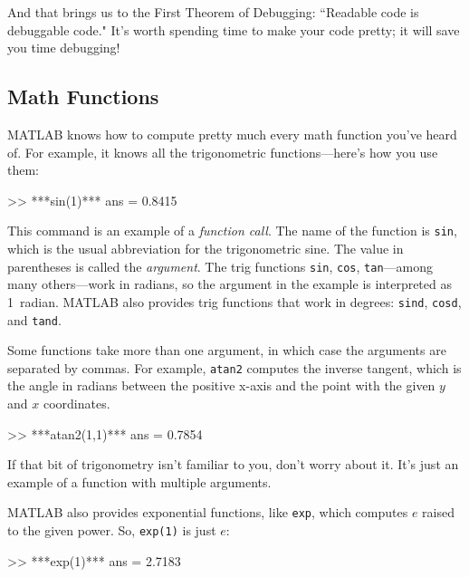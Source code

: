 
And that brings us to the First Theorem of Debugging: ``Readable code is debuggable code."
It's worth spending time to make your code pretty; it will save
you time \mbox{debugging}!


\subsection{Math Functions}

MATLAB knows how to compute pretty much every math function you've
heard of. For example, it knows all the trigonometric functions---here's how you
use them:


\begin{code}
>> ***sin(1)***
ans = 0.8415
\end{code}

This command is an example of a \emph{function call}.  The name of the
function is \lstinline{sin}, which is the usual abbreviation for the
trigonometric sine.  The value in parentheses is called the \emph{argument}.
%
%
The trig functions \lstinline{sin}, \lstinline{cos}, \lstinline{tan}---among many
others---work in radians, so the argument in the example is interpreted as 1~radian.
MATLAB also provides trig functions that work in degrees: \lstinline{sind}, \lstinline{cosd}, and \lstinline{tand}.

Some functions take more than one argument, in which case the arguments are
separated by commas.  For example, \lstinline{atan2} computes the inverse
tangent, which is the angle in radians between the positive x-axis and
the point with the given $y$ and $x$ coordinates.

\begin{code}
>> ***atan2(1,1)***
ans = 0.7854
\end{code}

If that bit of trigonometry isn't familiar to you, don't worry about
it.  It's just an example of a function with multiple arguments.


MATLAB also provides exponential functions, like \lstinline{exp}, which computes $e$ raised to the given power.  So, \lstinline{exp(1)} is just $e$:

\begin{code}
>> ***exp(1)***
ans = 2.7183
\end{code}

